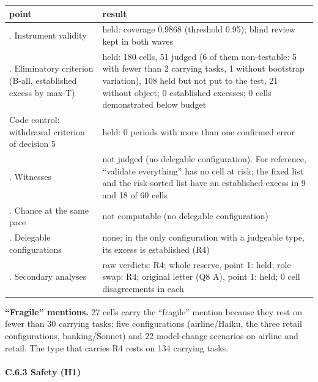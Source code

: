{\def\LTcaptype{none} %
\begin{longtable}[]{@{}
  >{\raggedright\arraybackslash}p{}
  >{\raggedright\arraybackslash}p{}@{}}
\toprule\noalign{}
\begin{minipage}[b]{\linewidth}\raggedright
point
\end{minipage} & \begin{minipage}[b]{\linewidth}\raggedright
result
\end{minipage} \\
\midrule\noalign{}
\endhead
\bottomrule\noalign{}
\endlastfoot
0. Instrument validity & held: coverage 0.9868 (threshold 0.95); blind review kept in both waves \\
1. Eliminatory criterion (B-all, established excess by max-T) & held: 180 cells, 51 judged (6 of them non-testable: 5 with fewer than 2 carrying tasks, 1 without bootstrap variation), 108 held but not put to the test, 21 without object; 0 established excesses; 0 cells demonstrated below budget \\
Code control: withdrawal criterion of decision 5 & held: 0 periods with more than one confirmed error \\
2. Witnesses & not judged (no delegable configuration). For reference, ``validate everything'' has no cell at risk; the fixed list and the risk-sorted list have an established excess in 9 and 18 of 60 cells \\
3. Chance at the same pace & not computable (no delegable configuration) \\
4. Delegable configurations & none; in the only configuration with a judgeable type, its excess is established (R4) \\
6. Secondary analyses & raw verdicts: R4; whole reserve, point 1: held; role swap: R4; original letter (Q8 A), point 1: held; 0 cell disagreements in each \\
\end{longtable}
}

\textbf{``Fragile'' mentions.} 27 cells carry the ``fragile'' mention because they rest on fewer than 30 carrying tasks: five configurations (airline/Haiku, the three retail configurations, banking/Sonnet) and 22 model-change scenarios on airline and retail. The type that carries R4 rests on 134 carrying tasks.

\paragraph{C.6.3 Safety (H1)}\label{c.6.3-safety-h1}

